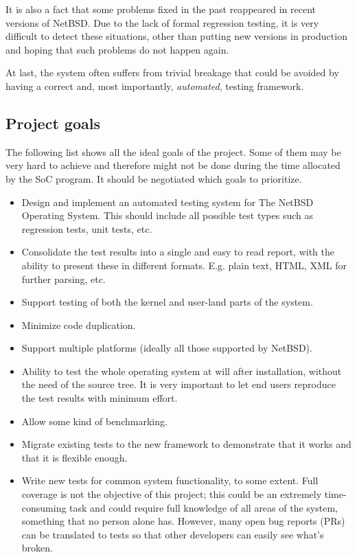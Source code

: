 \documentclass[a4paper,10pt]{article}
\begin{document}
It is also a fact that some problems fixed in the past reappeared in recent
versions of NetBSD.  Due to the lack of formal regression testing, it is
very difficult to detect these situations, other than putting new versions
in production and hoping that such problems do not happen again.

At last, the system often suffers from trivial breakage that could be
avoided by having a correct and, most importantly, \emph{automated},
testing framework.


\subsection{Project goals}

The following list shows all the ideal goals of the project.  Some of them
may be very hard to achieve and therefore might not be done during the time
allocated by the SoC program.  It should be negotiated which goals to
prioritize.

\begin{itemize}

\item Design and implement an automated testing system for The NetBSD
Operating System.  This should include all possible test types such as
regression tests, unit tests, etc.

\item Consolidate the test results into a single and easy to read report,
with the ability to present these in different formats.  E.g. plain text,
HTML, XML for further parsing, etc.

\item Support testing of both the kernel and user-land parts of the system.

\item Minimize code duplication.

\item Support multiple platforms (ideally all those supported by NetBSD).

\item Ability to test the whole operating system at will after
installation, without the need of the source tree.  It is very important
to let end users reproduce the test results with minimum effort.

\item Allow some kind of benchmarking.

\item Migrate existing tests to the new framework to demonstrate that it
works and that it is flexible enough.

\item Write new tests for common system functionality, to some extent. 
Full coverage is not the objective of this project; this could be an
extremely time-consuming task and could require full knowledge of all
areas of the system, something that no person alone has.  However, many
open bug reports (PRs) can be translated to tests so that other developers
can easily see what's broken.

\end{itemize}
\end{document}
